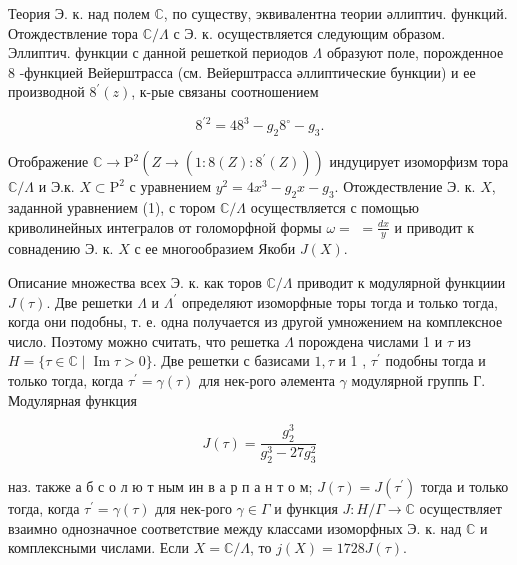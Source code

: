 \documentclass[10pt]{article}
\begin{document}
Теория Э. к. над полем $\mathbb{C}$, по существу, эквивалентна теории әллиптич. функций. Отождествление тора $\mathbb{C} / \Lambda$ с Э. к. осуществляется следующим образом. Эллиптич. функции с данной решеткой периодов $\Lambda$ образуют поле, порожденное 8 -функцией Вейерштрасса (см. Вейерштрасса әллиптические бункции) и ее производной $8^{\prime}(z)$, к-рые связаны соотношением



\[

8^{\prime 2}=48^{3}-g_{2} 8^{\circ}-g_{3} .

\]



Отображение $\mathbb{C} \longrightarrow \mathrm{P}^{2}\left(Z \longrightarrow\left(1: 8(Z): 8^{\prime}(Z)\right)\right)$ индуцирует изоморфизм тора $\mathbb{C} / \Lambda$ и Э.к. $X \subset \mathrm{P}^{2}$ с уравнением $y^{2}=4 x^{3}-g_{2} x-g_{3}$. Отождествление Э. к. $X$, заданной уравнением (1), с тором $\mathbb{C} / \Lambda$ осуществляется с помощью криволинейных интегралов от голоморфной формы $\omega=$ $=\frac{d x}{y}$ и приводит к совнадению Э. к. $X$ с ее многообразием Якоби $J(X)$.



Описание множества всех Э. к. как торов $\mathbb{C} / \Lambda$ приводит к модулярной функциии $J(\tau)$. Две решетки $\Lambda$ и $\Lambda^{\prime}$ определяют изоморфные торы тогда и только тогда, когда они подобны, т. е. одна получается из другой умножением на комплексное число. Поэтому можно считать, что решетка $\Lambda$ порождена числами 1 и $\tau$ из $H=\{\tau \in \mathbb{C} \mid \operatorname{Im} \tau>0\}$. Две решетки с базисами $1, \tau$ и 1 , $\tau^{\prime}$ подобны тогда и только тогда, когда $\tau^{\prime}=\gamma(\tau)$ для нек-рого әлемента $\gamma$ модулярной группь Г. Модулярная функция



\[

J(\tau)=\frac{g_{2}^{3}}{g_{2}^{3}-27 g_{3}^{2}}

\]



наз. также а б с о л ю т ным ин в а р п а н т о м; $J(\tau)=J\left(\tau^{\prime}\right)$ тогда и только тогда, когда $\tau^{\prime}=\gamma(\tau)$ для нек-рого $\gamma \in \Gamma$ и функция $J: H / \Gamma \rightarrow \mathbb{C}$ осуществляет взаимно однозначное соответствие между классами изоморфных Э. к. над $\mathbb{C}$ и комплексными числами. Если $X=\mathbb{C} / \Lambda$, то $j(X)=1728 J(\tau)$.
\end{document}
